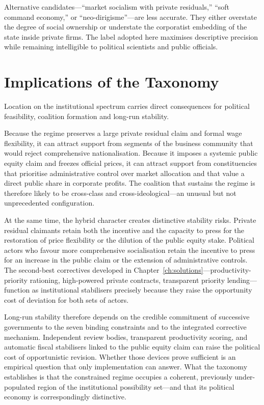 \documentclass[12pt,anyside]{book}
\theoremstyle{definition}
\theoremstyle{plain}
\theoremstyle{remark}
\begin{document}
Alternative candidates—“market socialism with private residuals,” “soft command economy,” or “neo-dirigisme”—are less accurate. They either overstate the degree of social ownership or understate the corporatist embedding of the state inside private firms. The label adopted here maximises descriptive precision while remaining intelligible to political scientists and public officials.

\section{Implications of the Taxonomy}

Location on the institutional spectrum carries direct consequences for political feasibility, coalition formation and long-run stability.

Because the regime preserves a large private residual claim and formal wage flexibility, it can attract support from segments of the business community that would reject comprehensive nationalisation. Because it imposes a systemic public equity claim and freezes official prices, it can attract support from constituencies that prioritise administrative control over market allocation and that value a direct public share in corporate profits. The coalition that sustains the regime is therefore likely to be cross-class and cross-ideological—an unusual but not unprecedented configuration.

At the same time, the hybrid character creates distinctive stability risks. Private residual claimants retain both the incentive and the capacity to press for the restoration of price flexibility or the dilution of the public equity stake. Political actors who favour more comprehensive socialisation retain the incentive to press for an increase in the public claim or the extension of administrative controls. The second-best correctives developed in Chapter~\ref{ch:solutions}—productivity-priority rationing, high-powered private contracts, transparent priority lending—function as institutional stabilisers precisely because they raise the opportunity cost of deviation for both sets of actors.

Long-run stability therefore depends on the credible commitment of successive governments to the seven binding constraints and to the integrated corrective mechanism. Independent review bodies, transparent productivity scoring, and automatic fiscal stabilisers linked to the public equity claim can raise the political cost of opportunistic revision. Whether those devices prove sufficient is an empirical question that only implementation can answer. What the taxonomy establishes is that the constrained regime occupies a coherent, previously under-populated region of the institutional possibility set—and that its political economy is correspondingly distinctive.
\end{document}
